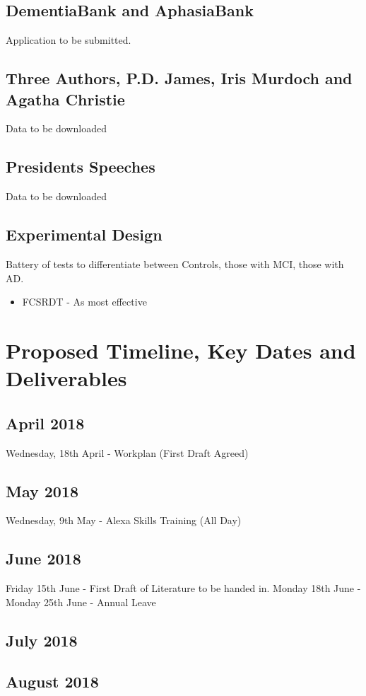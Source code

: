 \documentclass{article}
\begin{document}
	\subsection{DementiaBank and AphasiaBank}
	Application to be submitted.
	
	\subsection {Three Authors, P.D. James, Iris Murdoch and Agatha Christie}	
	Data to be downloaded
	
	\subsection{Presidents Speeches}
	Data to be downloaded
	
	\subsection{Experimental Design}
	Battery of tests to differentiate between Controls, those with MCI, those with AD. 
	\begin{itemize}
		\item FCSRDT - As most effective 
	\end{itemize}
	
	
	\section{Proposed Timeline, Key Dates and Deliverables}
	\subsection{April 2018}
	Wednesday, 18th April - Workplan (First Draft Agreed)
	\subsection{May 2018}
	Wednesday, 9th May - Alexa Skills Training (All Day)
	\subsection{June 2018}
	Friday 15th June - First Draft of Literature to be handed in.
	Monday 18th June - Monday 25th June - Annual Leave
	\subsection{July 2018}
	
	\subsection{August 2018}
	
\end{document}

